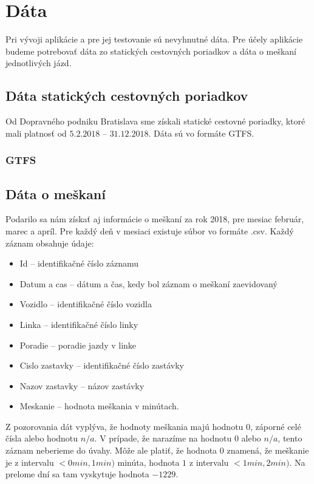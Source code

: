 \section{Dáta}
Pri vývoji aplikácie a pre jej testovanie sú nevyhnutné dáta. Pre účely aplikácie budeme potrebovať dáta zo statických cestovných poriadkov a dáta o meškaní jednotlivých jázd. 

\subsection{Dáta statických cestovných poriadkov}
Od Dopravného podniku Bratislava sme získali statické cestovné poriadky, ktoré mali platnosť od $5.2.2018$ – $31.12.2018$. Dáta sú vo formáte GTFS. 

\subsubsection{GTFS}

\subsection{Dáta o meškaní}
Podarilo sa nám získať aj informácie o meškaní za rok 2018, pre mesiac február, marec a apríl. Pre každý deň v mesiaci existuje súbor vo formáte .csv. Každý záznam obsahuje údaje:
\begin{itemize}
\item{Id – identifikačné číslo záznamu}
\item{Datum a cas – dátum a čas, kedy bol záznam o meškaní zaevidovaný}
\item{Vozidlo – identifikačné číslo vozidla}
\item{Linka – identifikačné číslo linky}
\item{Poradie – poradie jazdy v linke}
\item{Cislo zastavky – identifikačné číslo zastávky}
\item{Nazov zastavky – názov zastávky}
\item{Meskanie – hodnota meškania v minútach.}
\end{itemize}

Z pozorovania dát vyplýva, že hodnoty meškania majú hodnotu $0$, záporné celé čísla alebo hodnotu $n/a$. V prípade, že narazíme na hodnotu $0$ alebo $n/a$, tento záznam neberieme do úvahy. Môže ale platiť, že hodnota $0$ znamená, že meškanie je z intervalu $<0 min, 1 min)$ minúta, hodnota $1$ z intervalu $<1 min, 2 min)$. Na prelome dní sa tam vyskytuje hodnota $-1229$. 

